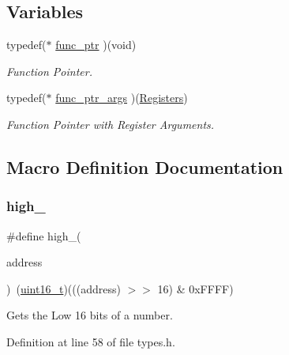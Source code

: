 \subsection*{Variables}
\begin{DoxyCompactItemize}
\item 
typedef($\ast$ \hyperlink{a00116_a5e730b1100d491afc6fa17d12fcd15a8_a5e730b1100d491afc6fa17d12fcd15a8}{func\+\_\+ptr} )(void)
\begin{DoxyCompactList}\small\item\em Function Pointer. \end{DoxyCompactList}\item 
typedef($\ast$ \hyperlink{a00116_a7ec4af7c086c1f2c2a0e01fc23203a56_a7ec4af7c086c1f2c2a0e01fc23203a56}{func\+\_\+ptr\+\_\+args} )(\hyperlink{a00218}{Registers})
\begin{DoxyCompactList}\small\item\em Function Pointer with Register Arguments. \end{DoxyCompactList}\end{DoxyCompactItemize}


\subsection{Macro Definition Documentation}
\mbox{\label{a00116_a0a63db19c3e2153ed419aeccf4e33c92_a0a63db19c3e2153ed419aeccf4e33c92}} 
\subsubsection{\texorpdfstring{high\+\_}{high\_16}}
{\footnotesize\ttfamily \#define high\+\_(\begin{DoxyParamCaption}\item[{}]{address }\end{DoxyParamCaption})~(\hyperlink{a00116_a273cf69d639a59973b6019625df33e30_a273cf69d639a59973b6019625df33e30}{uint16\+\_\+t})(((address) $>$$>$ 16) \& 0x\+F\+F\+F\+F)}



Gets the Low 16 bits of a number. 



Definition at line 58 of file types.\+h.

\mbox{\label{a00116_aded7ad58a4bedfffea10d5ae9c0c817e_aded7ad58a4bedfffea10d5ae9c0c817e}} 
